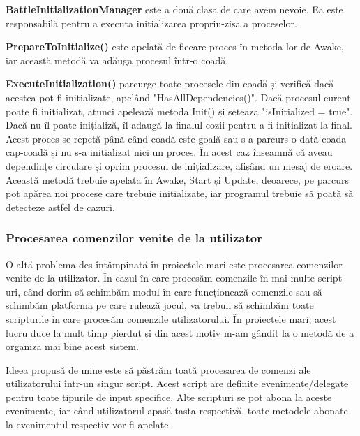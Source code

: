 \documentclass[12pt, a4paper]{article}
\begin{document}
	\textbf{BattleInitializationManager} este a două clasa de care avem nevoie. Ea este responsabilă pentru a executa initializarea propriu-zisă a proceselor. 
	\newline
	
	\textbf{PrepareToInitialize()} este apelată de fiecare proces în metoda lor de Awake, iar această metodă va adăuga procesul într-o coadă.
	\newline
	
	\textbf{ExecuteInitialization()} parcurge toate procesele din coadă și verifică dacă acestea pot fi initializate, apelând "HasAllDependencies()". Dacă procesul curent poate fi initializat, atunci apelează metoda Init() și setează "isInitialized = true". Dacă nu îl poate inițializă, îl adaugă la finalul cozii pentru a fi initializat la final. Acest proces se repetă până când coadă este goală sau s-a parcurs o dată coada cap-coadă și nu s-a initializat nici un proces. În acest caz înseamnă că aveau dependințe circulare și oprim procesul de inițializare, afișând un mesaj de eroare. Această metodă trebuie apelata în Awake, Start și Update, deoarece, pe parcurs pot apărea noi procese care trebuie initializate, iar programul trebuie să poată să detecteze astfel de cazuri.
	
	
	
	
	
	\subsubsection{Procesarea comenzilor venite de la utilizator}
	
	O altă problema des întâmpinată în proiectele mari este procesarea comenzilor venite de la utilizator. În cazul în care procesăm comenzile în mai multe script-uri, când dorim să schimbăm modul în care funcționează comenzile sau să schimbăm platforma pe care rulează jocul, va trebuii să schimbăm toate scripturile în care procesăm comenzile utilizatorului. În proiectele mari, acest lucru duce la mult timp pierdut și din acest motiv m-am gândit la o metodă de a organiza mai bine acest sistem.
	\newline
	
	Ideea propusă de mine este să păstrăm toată procesarea de comenzi ale utilizatorului într-un singur script. Acest script are definite evenimente/delegate pentru toate tipurile de input specifice. Alte scripturi se pot abona la aceste evenimente, iar când utilizatorul apasă tasta respectivă, toate metodele abonate la evenimentul respectiv vor fi apelate.
	\newline
	
\end{document}
